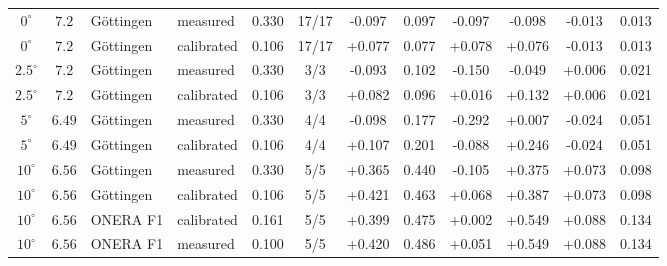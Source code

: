 \begin{table}[H]
\begin{tabular}{cc l l c c cccc cc}
    \midrule
    $0^\circ$ & $7.2$ & G\"ottingen & measured & 0.330 & 17/17 & -0.097 & 0.097 & -0.097 & -0.098 & -0.013 & 0.013 \\
    $0^\circ$ & $7.2$ & G\"ottingen & calibrated & 0.106 & 17/17 & +0.077 & 0.077 & +0.078 & +0.076 & -0.013 & 0.013 \\
    $2.5^\circ$ & $7.2$ & G\"ottingen & measured & 0.330 & 3/3 & -0.093 & 0.102 & -0.150 & -0.049 & +0.006 & 0.021 \\
    $2.5^\circ$ & $7.2$ & G\"ottingen & calibrated & 0.106 & 3/3 & +0.082 & 0.096 & +0.016 & +0.132 & +0.006 & 0.021 \\
    $5^\circ$ & $6.49$ & G\"ottingen & measured & 0.330 & 4/4 & -0.098 & 0.177 & -0.292 & +0.007 & -0.024 & 0.051 \\
    $5^\circ$ & $6.49$ & G\"ottingen & calibrated & 0.106 & 4/4 & +0.107 & 0.201 & -0.088 & +0.246 & -0.024 & 0.051 \\
    $10^\circ$ & $6.56$ & G\"ottingen & measured & 0.330 & 5/5 & +0.365 & 0.440 & -0.105 & +0.375 & +0.073 & 0.098 \\
    $10^\circ$ & $6.56$ & G\"ottingen & calibrated & 0.106 & 5/5 & +0.421 & 0.463 & +0.068 & +0.387 & +0.073 & 0.098 \\
    $10^\circ$ & $6.56$ & ONERA F1 & calibrated & 0.161 & 5/5 & +0.399 & 0.475 & +0.002 & +0.549 & +0.088 & 0.134 \\
    $10^\circ$ & $6.56$ & ONERA F1 & measured & 0.100 & 5/5 & +0.420 & 0.486 & +0.051 & +0.549 & +0.088 & 0.134 \\
    \bottomrule
  \end{tabular}
\end{table}

